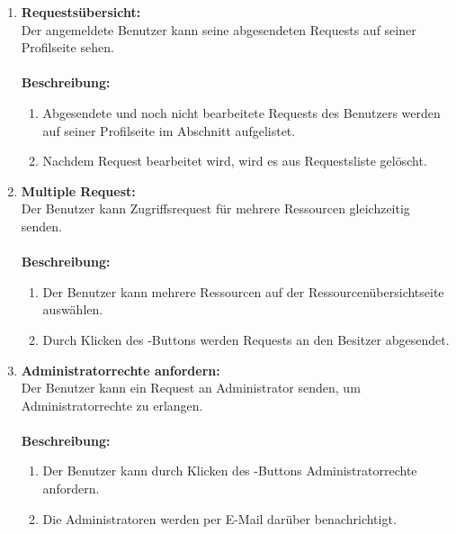 \documentclass[parskip=full,11pt]{scrartcl}
\def\threedigits#1{%
  \ifnum#1<10 0\fi
  \ifnum#1<1 0\fi
  \number#1}
\begin{document}
\begin{enumerate}[label={\textbf{/F\protect\threedigits{\theenumi}0/}}, leftmargin=*]
\item \label{FAB7} \colorbox{shadecolor} {\textbf{Requestsübersicht:}}\\ Der angemeldete Benutzer kann seine abgesendeten Requests auf seiner Profilseite sehen. \\\\
\textbf{Beschreibung:}\\
\begin{enumerate}[label=(\arabic*), leftmargin=*]
\item Abgesendete und noch nicht bearbeitete Requests des Benutzers werden auf seiner Profilseite im Abschnitt \grqq \: aufgelistet.
\item Nachdem Request bearbeitet wird, wird es aus Requestsliste gelöscht.
\end{enumerate}

\item \label{FAB8} \colorbox{shadecolor} {\textbf{Multiple Request:}}\\ Der Benutzer kann Zugriffsrequest für mehrere Ressourcen gleichzeitig senden.\\\\
\textbf{Beschreibung:}\\
\begin{enumerate}[label=(\arabic*), leftmargin=*]
\item Der Benutzer kann mehrere Ressourcen auf der Ressourcenübersichtseite auswählen.
\item Durch Klicken des \grqq -Buttons werden Requests an den Besitzer abgesendet.
\end{enumerate}

\item \label{FAB9} \colorbox{shadecolor} {\textbf{Administratorrechte anfordern:}}\\ Der Benutzer kann ein Request an Administrator senden, um Administratorrechte zu erlangen.\\\\
\textbf{Beschreibung:}\\
\begin{enumerate}[label=(\arabic*), leftmargin=*]
\item Der Benutzer kann durch Klicken des \grqq -Buttons Administratorrechte anfordern.
\item Die Administratoren werden per E-Mail darüber benachrichtigt.
\end{enumerate}
\newpage


\end{enumerate}
\end{document}

